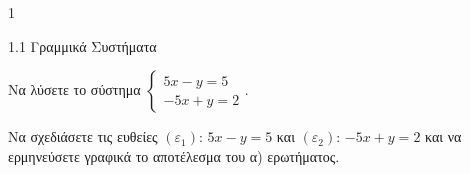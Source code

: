 \begin{ylh}{1}
\item 1.1 Γραμμικά Συστήματα
\end{ylh}
\begin{alist}
\item Να λύσετε το σύστημα $\begin{cases} 5x - y = 5 \\ -5x + y = 2 \end{cases}$.
\item Να σχεδιάσετε τις ευθείες $(\varepsilon_1)$: $5x - y = 5$ και $(\varepsilon_2)$: $-5x + y = 2$ και να ερμηνεύσετε γραφικά το αποτέλεσμα του α) ερωτήματος.
\end{alist}

